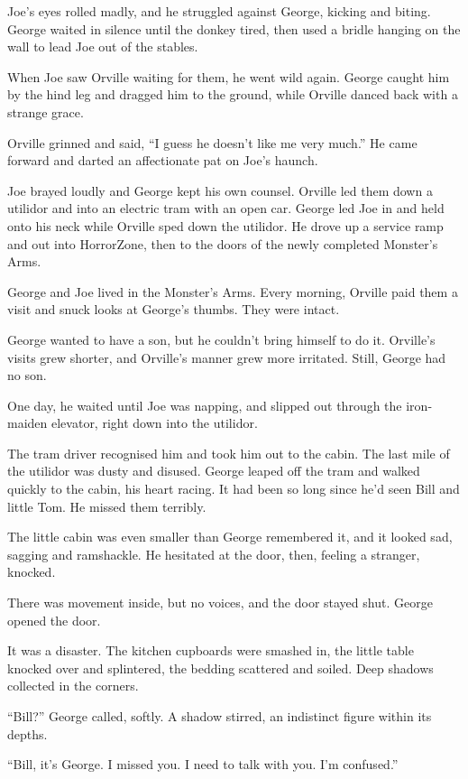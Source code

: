 Joe's eyes rolled madly, and he struggled against George, kicking
and biting. George waited in silence until the donkey tired, then
used a bridle hanging on the wall to lead Joe out of the stables.

When Joe saw Orville waiting for them, he went wild again. George
caught him by the hind leg and dragged him to the ground, while
Orville danced back with a strange grace.

Orville grinned and said, ``I guess he doesn't like me very much.''
He came forward and darted an affectionate pat on Joe's haunch.

Joe brayed loudly and George kept his own counsel. Orville led them
down a utilidor and into an electric tram with an open car. George
led Joe in and held onto his neck while Orville sped down the
utilidor. He drove up a service ramp and out into HorrorZone, then
to the doors of the newly completed Monster's Arms.

\tb

George and Joe lived in the Monster's Arms. Every morning, Orville
paid them a visit and snuck looks at George's thumbs. They were
intact.

George wanted to have a son, but he couldn't bring himself to do
it. Orville's visits grew shorter, and Orville's manner grew more
irritated. Still, George had no son.

One day, he waited until Joe was napping, and slipped out through
the iron-maiden elevator, right down into the utilidor.

The tram driver recognised him and took him out to the cabin. The
last mile of the utilidor was dusty and disused. George leaped off
the tram and walked quickly to the cabin, his heart racing. It had
been so long since he'd seen Bill and little Tom. He missed them
terribly.

The little cabin was even smaller than George remembered it, and it
looked sad, sagging and ramshackle. He hesitated at the door, then,
feeling a stranger, knocked.

There was movement inside, but no voices, and the door stayed shut.
George opened the door.

It was a disaster. The kitchen cupboards were smashed in, the
little table knocked over and splintered, the bedding scattered and
soiled. Deep shadows collected in the corners.

``Bill?'' George called, softly. A shadow stirred, an indistinct
figure within its depths.

``Bill, it's George. I missed you. I need to talk with you. I'm confused.''

